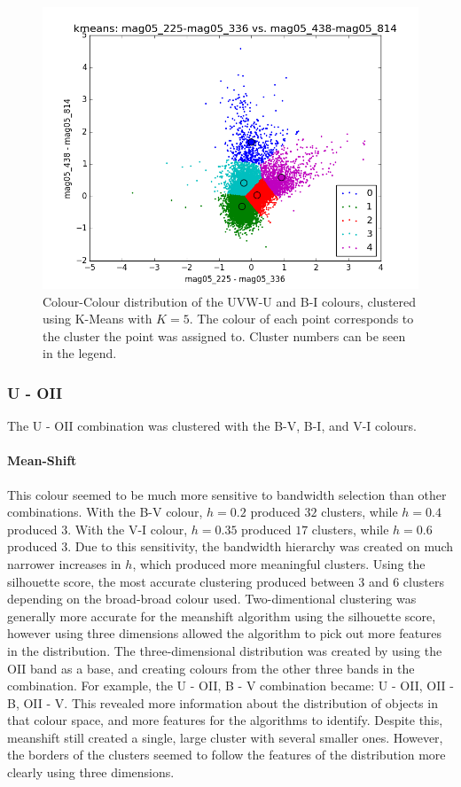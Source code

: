 \begin{figure}[H]
\centering
\includegraphics[width=\linewidth]{figs/kmeans_xy_5cl_mag05_225-mag05_336vsmag05_438-mag05_814}
\caption{Colour-Colour distribution of the UVW-U and B-I colours, clustered using K-Means with $K=5$. The colour of each point corresponds to the cluster the point was assigned to. Cluster numbers can be seen in the legend.}
\label{fig:UVWKM2}
\end{figure}

\subsubsection{U - OII}
The U - OII combination was clustered with the B-V, B-I, and V-I colours. %

\paragraph{Mean-Shift}
This colour seemed to be much more sensitive to bandwidth selection than other combinations.
With the B-V colour, $h=0.2$ produced $32$ clusters, while $h=0.4$ produced $3$. With the V-I colour, $h=0.35$ produced $17$ clusters, while $h=0.6$ produced $3$.
Due to this sensitivity, the bandwidth hierarchy was created on much narrower increases in $h$, which produced more meaningful clusters.
Using the silhouette score, the most accurate clustering produced between 3 and 6 clusters depending on the broad-broad colour used.
Two-dimentional clustering was generally more accurate for the meanshift algorithm using the silhouette score, however using three dimensions allowed the algorithm to pick out more features in the distribution. 
The three-dimensional distribution was created by using the OII band as a base, and creating colours from the other three bands in the combination. For example, the U - OII, B - V combination became: U - OII, OII - B, OII - V.
This revealed more information about the distribution of objects in that colour space, and more features for the algorithms to identify.
Despite this, meanshift still created a single, large cluster with several smaller ones. However, the borders of the clusters seemed to follow the features of the distribution more clearly using three dimensions.

